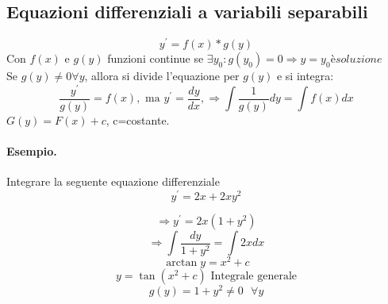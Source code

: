 \subsection{Equazioni differenziali a variabili separabili}
\begin{equation}
	y^\prime=f(x)*g(y)
\end{equation}
Con $f(x)$ e $g(y)$ funzioni continue se $\exists y_0:g(y_0)=0\Rightarrow y=y_0 è soluzione$\\
Se $g(y)\neq 0 \forall y$, allora si divide l'equazione per $g(y)$ e si integra:
\begin{equation}
	\frac{y^\prime}{g(y)}=f(x), \text{ ma } y^\prime=\frac{dy}{dx}, \Rightarrow \int \frac{1}{g(y)}dy=\int f(x)dx
\end{equation}
$G(y)=F(x)+c$, c=costante.
\paragraph{Esempio.} Integrare la seguente equazione differenziale
\begin{equation*}
	y^\prime=2x+2xy^2
\end{equation*}
\begin{multicols}{2}
	\begin{equation*}
		\Rightarrow y^\prime=2x(1+y^2)
	\end{equation*}
	\begin{equation*}
		\Rightarrow \int \frac{dy}{1+y^2}=\int2xdx
	\end{equation*}
	\begin{equation*}
		\arctan y=x^2+c
	\end{equation*}
	\begin{equation*}
		y=\tan(x^2+c) \text{ Integrale generale}
	\end{equation*}
	\begin{equation*}
		g(y)=1+y^2 \neq 0\text{ } \forall y
	\end{equation*}

\end{multicols}



